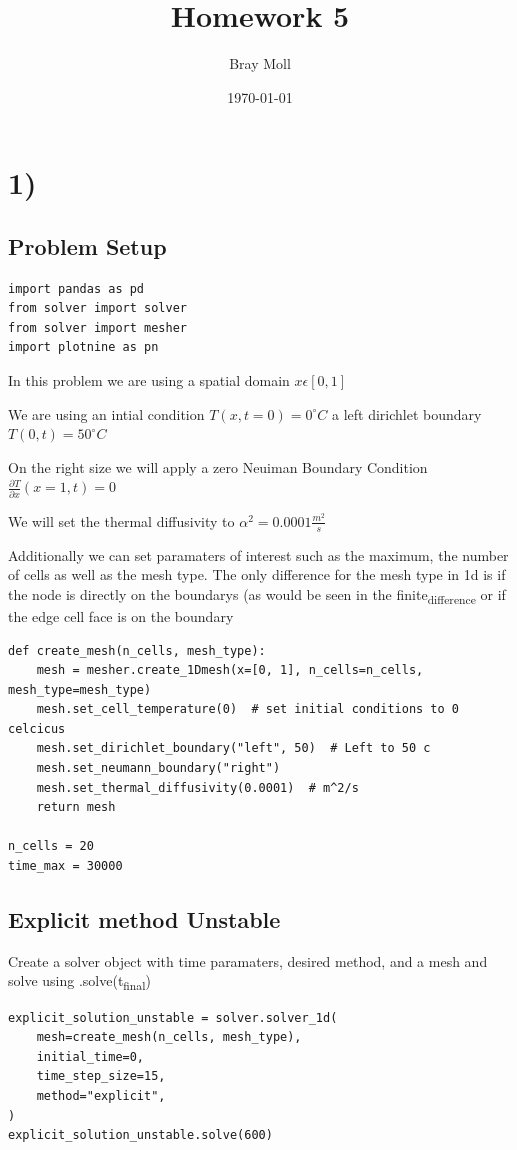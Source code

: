 \documentclass[letterpaper, 11pt]{article}
\author{Bray Moll}
\date{\today}
\title{Homework 5}
\begin{document}
\maketitle


\section{1)}
\label{sec:orgd8c2685}
\subsection{Problem Setup}
\label{sec:org628190f}
\begin{verbatim}
import pandas as pd
from solver import solver
from solver import mesher
import plotnine as pn
\end{verbatim}

In this problem we are using a spatial domain
\(x \epsilon [0,1]\)

We are using an intial condition
\(T(x, t=0) = 0^\circ C\)
a left dirichlet boundary
\(T(0, t) = 50^\circ C\)

On the right size we will apply a zero Neuiman Boundary Condition
\(\frac{\partial T}{\partial x} (x = 1, t) = 0\)

We will set the thermal diffusivity to
\(\alpha ^2 = 0.0001 \frac{m^2}{s}\)

Additionally we can set paramaters of interest such as the maximum, the number of cells as well as the mesh type. The only difference for the mesh type in 1d is if the node is directly on the boundarys (as would be seen in the finite\textsubscript{difference} or if the edge cell face is on the boundary
\begin{verbatim}
def create_mesh(n_cells, mesh_type):
    mesh = mesher.create_1Dmesh(x=[0, 1], n_cells=n_cells, mesh_type=mesh_type)
    mesh.set_cell_temperature(0)  # set initial conditions to 0 celcicus
    mesh.set_dirichlet_boundary("left", 50)  # Left to 50 c
    mesh.set_neumann_boundary("right")
    mesh.set_thermal_diffusivity(0.0001)  # m^2/s
    return mesh

n_cells = 20
time_max = 30000

\end{verbatim}
\subsection{Explicit method Unstable}
\label{sec:orgeba8a31}
Create a solver object with time paramaters, desired method, and a mesh and solve using .solve(t\textsubscript{final})
\begin{verbatim}
explicit_solution_unstable = solver.solver_1d(
    mesh=create_mesh(n_cells, mesh_type),
    initial_time=0,
    time_step_size=15,
    method="explicit",
)
explicit_solution_unstable.solve(600)

\end{verbatim}
\end{document}
